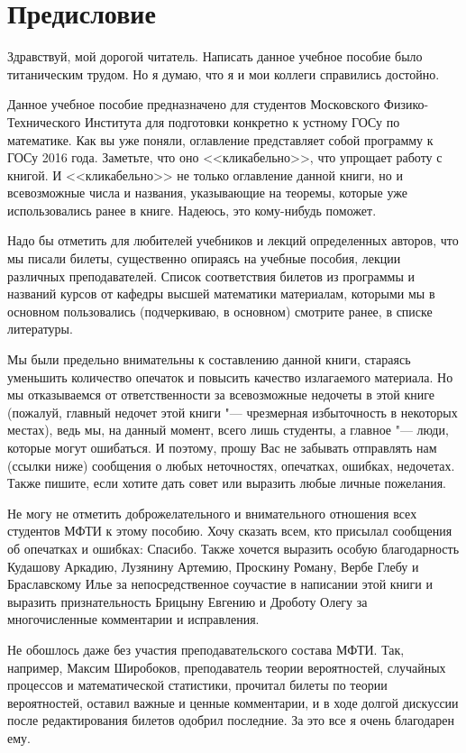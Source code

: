 \chapter{Предисловие}
Здравствуй, мой дорогой читатель. Написать данное учебное пособие было титаническим трудом. Но я думаю, что я и мои коллеги справились достойно.

Данное учебное пособие предназначено для студентов Московского Физико-Технического Института для подготовки конкретно к устному ГОСу по математике. Как вы уже поняли, оглавление представляет собой программу к ГОСу 2016 года. Заметьте, что оно <<кликабельно>>, что упрощает работу с книгой. И <<кликабельно>> не только оглавление данной книги, но и всевозможные числа и названия, указывающие на теоремы, которые уже использовались ранее в книге. Надеюсь, это кому-нибудь поможет. 

Надо бы отметить для любителей учебников и лекций определенных авторов, что мы писали билеты, существенно опираясь на учебные пособия, лекции различных преподавателей. Список соответствия билетов из программы и названий курсов от кафедры высшей математики материалам, которыми мы в основном пользовались (подчеркиваю, в основном) смотрите ранее, в списке литературы.

Мы были предельно внимательны к составлению данной книги, стараясь уменьшить количество опечаток и повысить качество излагаемого материала. Но мы отказываемся от ответственности за всевозможные недочеты в этой книге (пожалуй, главный недочет этой книги "--- чрезмерная избыточность в некоторых местах), ведь мы, на данный момент, всего лишь студенты, а главное "--- люди, которые могут ошибаться. И поэтому, прошу Вас не забывать отправлять нам (ссылки ниже) сообщения о любых неточностях, опечатках, ошибках, недочетах. Также пишите, если хотите дать совет или выразить любые личные пожелания. 

Не могу не отметить доброжелательного и внимательного отношения всех студентов МФТИ к этому пособию. Хочу сказать всем, кто присылал сообщения об опечатках и ошибках: \glqq Спасибо\grqq. Также хочется выразить особую благодарность Кудашову Аркадию, Лузянину Артемию, Проскину Роману, Вербе Глебу и Браславскому Илье за непосредственное соучастие в написании этой книги и выразить признательность Брицыну Евгению и Дроботу Олегу за многочисленные комментарии и исправления.

Не обошлось даже без участия преподавательского состава МФТИ. Так, например, Максим Широбоков, преподаватель теории вероятностей, случайных процессов и математической статистики, прочитал билеты по теории вероятностей, оставил важные и ценные комментарии, и в ходе долгой дискуссии после редактирования билетов одобрил последние. За это все я очень благодарен ему.


